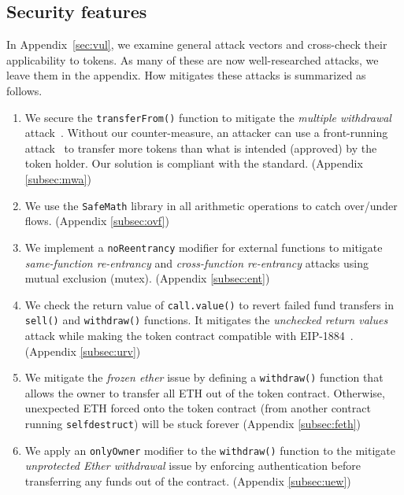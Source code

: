 \subsection{Security features}
In Appendix~\ref{sec:vul}, we examine general attack vectors and cross-check their applicability to \erc tokens. As many of these are now well-researched attacks, we leave them in the appendix. How \sys mitigates these attacks is summarized as follows. 
\begin{enumerate}[noitemsep,topsep=0pt]

	\item  We secure the \texttt{transferFrom()} function to mitigate the \textit{multiple withdrawal} attack~\cite{ERC20MWA}. Without our counter-measure, an attacker can use a front-running attack~\cite{OrderingAttack,eskandari2019sok} to transfer more tokens than what is intended (approved) by the token holder. Our solution is compliant with the \erc standard. (\cf Appendix \ref{subsec:mwa})

	\item We use the \texttt{SafeMath} library in all arithmetic operations to catch over/under flows. (\cf Appendix \ref{subsec:ovf})

	\item We implement a \texttt{noReentrancy} modifier for external functions to mitigate \textit{same-function re-entrancy} and \textit{cross-function re-entrancy} attacks using mutual exclusion (mutex). (\cf Appendix \ref{subsec:ent})

	\item We check the return value of \texttt{call.value()} to revert failed fund transfers in \texttt{sell()} and \texttt{withdraw()} functions. It mitigates the \textit{unchecked return values} attack while making the token contract compatible with EIP-1884~\cite{EIP1884}. (\cf Appendix \ref{subsec:urv})

	\item We mitigate the \textit{frozen ether} issue by defining a \texttt{withdraw()} function that allows the owner to transfer all ETH out of the token contract. Otherwise, unexpected ETH forced onto the token contract (\eg from another contract running \texttt{selfdestruct}) will be stuck forever (\cf Appendix \ref{subsec:feth})

	\item We apply an \texttt{onlyOwner} modifier to the \texttt{withdraw()} function to the mitigate \textit{unprotected Ether withdrawal} issue by enforcing authentication before transferring any funds out of the contract. (\cf Appendix \ref{subsec:uew})


\end{enumerate}
